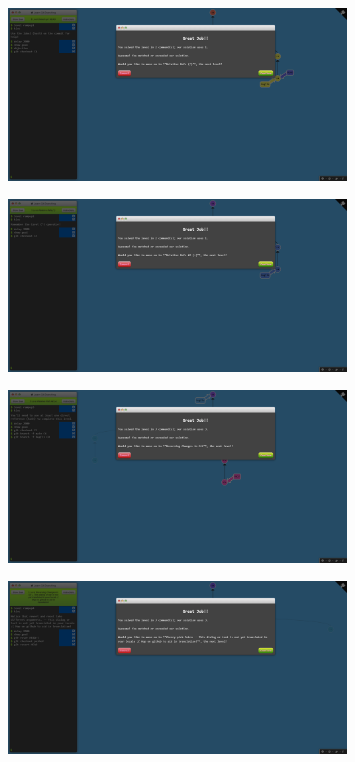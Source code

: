 \documentclass[a4paper]{article}
\begin{document}
\begin{figure}[H]
    \centering
    \includegraphics[width=0.8\textwidth]{8.png}
\end{figure}
\begin{figure}[H]
    \centering
    \includegraphics[width=0.8\textwidth]{9.png}
\end{figure}
\begin{figure}[H]
    \centering
    \includegraphics[width=0.8\textwidth]{10.png}
\end{figure}
\begin{figure}[H]
    \centering
    \includegraphics[width=0.8\textwidth]{11.png}
\end{figure}
\end{document}
